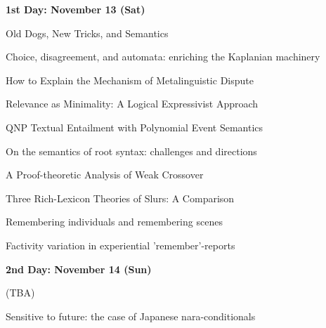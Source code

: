 \documentclass[12pt]{jarticle}
\begin{document}
\noindent\textbf{\large 
1st Day: November 13 (Sat)
}\\







  
      {Old Dogs, New Tricks, and Semantics}
      {}




  
      {Choice, disagreement, and automata: enriching the Kaplanian machinery}
      {}
  
      {How to Explain the Mechanism of Metalinguistic Dispute}
      {}
  
      {Relevance as Minimality: A Logical Expressivist Approach}
      {}




  
      {QNP Textual Entailment with Polynomial Event Semantics}
      {}
  
      {On the semantics of root syntax: challenges and directions}
      {}
  
      {A Proof-theoretic Analysis of Weak Crossover}
      {}




  
      {Three Rich-Lexicon Theories of Slurs: A Comparison}
      {}
  
      {Remembering individuals and remembering scenes}
      {}
  
      {Factivity variation in experiential 'remember'-reports}
      {}




\noindent\textbf{\large 
2nd Day: November 14 (Sun)
}\\



  
      {(TBA)}
      {}




  
      {Sensitive to future: the case of Japanese nara-conditionals}
      {}
  
\end{document}
